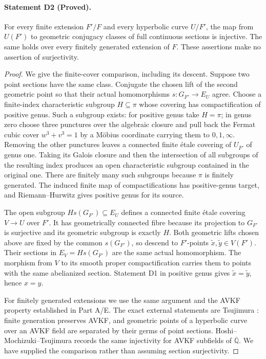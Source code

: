 
\paragraph{Statement D2 (Proved).}\label{res:D2}
For every finite extension $F'/F$ and every hyperbolic curve $U/F'$, the
map from $U(F')$ to geometric conjugacy classes of full continuous sections
is injective.  The same holds over every finitely generated extension of
$F$.  These assertions make no assertion of surjectivity.

\begin{proof}
We give the finite-cover comparison, including its descent.  Suppose two
point sections have the same class.  Conjugate the chosen lift of the
second geometric point so that their actual homomorphisms
$s:G_{F'}\to E_U$ agree.  Choose a finite-index characteristic subgroup
$H\subseteq\pi$ whose covering has compactification of positive genus.
Such a subgroup exists: for positive genus take $H=\pi$; in genus zero
choose three punctures over the algebraic closure and pull back the
Fermat cubic cover $w^3+v^3=1$ by a M\"obius coordinate carrying them to
$0,1,\infty$.  Removing the other punctures leaves a connected finite
\'etale covering of $U_{\overline F'}$ of genus one.  Taking its Galois
closure and then the intersection of all subgroups of the resulting
index produces an open characteristic subgroup contained in the original
one.  There are finitely many such subgroups because $\pi$ is finitely
generated.  The induced finite map of compactifications has positive-genus
target, and Riemann--Hurwitz gives positive genus for its source.

The open subgroup $H s(G_{F'})\subseteq E_U$ defines a connected finite
\'etale covering $V\to U$ over $F'$.  It has geometrically connected fibre
because its projection to $G_{F'}$ is surjective and its geometric subgroup
is exactly $H$.  Both geometric lifts chosen above are fixed by the common
$s(G_{F'})$, so descend to $F'$-points $\widetilde x,\widetilde y\in V(F')$.
Their sections in $E_V=H s(G_{F'})$ are the same actual homomorphism.
The morphism from $V$ to its smooth proper compactification carries them
to points with the same abelianized section.  Statement D1 in positive
genus gives $\widetilde x=\widetilde y$, hence $x=y$.

For finitely generated extensions we use the same argument and the AVKF
property established in Part A/E.  The exact external statements are
Tsujimura \cite[Proposition 1.2(ii), Proposition 4.2]{D_Tsujimura2022}:
finite generation preserves AVKF, and geometric points of a hyperbolic
curve over an AVKF field are separated by their germs of point sections.
Hoshi--Mochizuki--Tsujimura \cite[Definition 3.3(vi), Proposition 6.4]{D_HMT}
records the same injectivity for AVKF subfields of $\overline{\mathbb Q}$.
We have supplied the comparison rather than assuming section surjectivity.
\end{proof}

